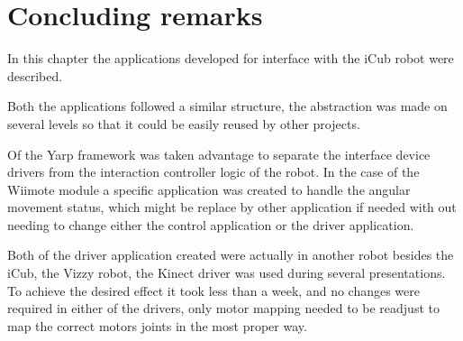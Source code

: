 \section{Concluding remarks}

	In this chapter the applications developed for interface with the iCub robot were described.
	
	Both the applications followed a similar structure, the abstraction was made on several levels so that it could be easily reused by other projects.
	
	Of the \ac{Yarp} framework was taken advantage to separate the interface device drivers from the interaction controller logic of the robot. In the case of the \ac{Wiimote} module a specific application was created to handle the angular movement status, which might be replace by other application if needed with out needing to change either the control application or the driver application.
	
	Both of the driver application created were actually in another robot besides the iCub, the Vizzy robot, the Kinect driver was used during several presentations. To achieve the desired effect it took less than a week, and no changes were required in either of the drivers, only motor mapping needed to be readjust to map the correct motors joints in the most proper way.

